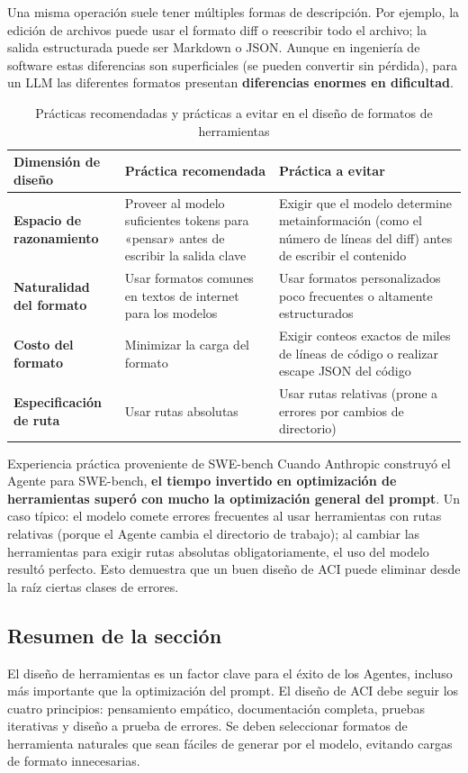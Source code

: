 Una misma operación suele tener múltiples formas de descripción. Por ejemplo, la edición de archivos puede usar el formato diff o reescribir todo el archivo; la salida estructurada puede ser Markdown o JSON. Aunque en ingeniería de software estas diferencias son superficiales (se pueden convertir sin pérdida), para un LLM las diferentes formatos presentan \textbf{diferencias enormes en dificultad}.

\begin{table}[H]
\centering
\begin{tabular}{>{\bfseries}p{3cm} p{4.5cm} p{4.5cm}}
\toprule
Dimensión de diseño & Práctica recomendada & Práctica a evitar \\
\midrule
Espacio de razonamiento & Proveer al modelo suficientes tokens para «pensar» antes de escribir la salida clave & Exigir que el modelo determine metainformación (como el número de líneas del diff) antes de escribir el contenido \\
Naturalidad del formato & Usar formatos comunes en textos de internet para los modelos & Usar formatos personalizados poco frecuentes o altamente estructurados \\
Costo del formato & Minimizar la carga del formato & Exigir conteos exactos de miles de líneas de código o realizar escape JSON del código \\
Especificación de ruta & Usar rutas absolutas & Usar rutas relativas (prone a errores por cambios de directorio) \\
\bottomrule
\end{tabular}
\caption{Prácticas recomendadas y prácticas a evitar en el diseño de formatos de herramientas}
\end{table}

\begin{knowledgebox}{Experiencia práctica proveniente de SWE-bench}
Cuando Anthropic construyó el Agente para SWE-bench, \textbf{el tiempo invertido en optimización de herramientas superó con mucho la optimización general del prompt}. Un caso típico: el modelo comete errores frecuentes al usar herramientas con rutas relativas (porque el Agente cambia el directorio de trabajo); al cambiar las herramientas para exigir rutas absolutas obligatoriamente, el uso del modelo resultó perfecto. Esto demuestra que un buen diseño de ACI puede eliminar desde la raíz ciertas clases de errores.
\end{knowledgebox}

\subsection{Resumen de la sección}
El diseño de herramientas es un factor clave para el éxito de los Agentes, incluso más importante que la optimización del prompt. El diseño de ACI debe seguir los cuatro principios: pensamiento empático, documentación completa, pruebas iterativas y diseño a prueba de errores. Se deben seleccionar formatos de herramienta naturales que sean fáciles de generar por el modelo, evitando cargas de formato innecesarias.

